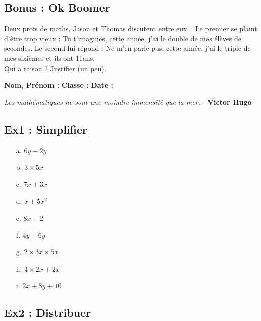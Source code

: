 \documentclass[11pt]{article}
\newcommand{\Pointilles}[1][3]{%
  \multido{}{#1}{\makebox[\linewidth]{\dotfill}\\[\parskip]
}}
\begin{document}
\Pointilles[18] 

\subsection*{Bonus : Ok Boomer}
Deux profs de maths, Jason et Thomas discutent entre eux... Le premier se plaint d'être trop vieux : \og Tu t'imagines, cette année, j'ai le double de mes élèves de secondes. \fg Le second lui répond : \og Ne m'en parle pas, cette année, j'ai le triple de mes sixièmes et ils ont 11ans. \fg \\
Qui a raison ? Justifier (un peu).

\Pointilles[3] \newpage

\textbf{Nom, Prénom :} \hspace{8cm} \textbf{Classe :} \hspace{3cm} \textbf{Date :}\\
\vspace{-0.8cm}
\begin{center}
  \textit{Les mathématiques ne sont une moindre immensité que la mer.}  - \textbf{Victor Hugo}
\end{center}
\vspace{-0.8cm}

\subsection*{Ex1 : Simplifier}

\begin{multicols}{3}

\begin{enumerate}
  \item[a.] $6y - 2y$
  \item[b.] $3 \times 5 x$
  \item[c.] $7x + 3x$
  \item[d.] $x + 5x^2$
  \item[e.] $8x - 2$
  \item[f.] $4y - 6y$
  \item[g.] $2 \times 3x \times 5x$
  \item[h.] $4 \times 2x + 2x$
  \item[i.] $2x + 8y + 10$    
\end{enumerate}

\end{multicols}

 \Pointilles[8] 

 \subsection*{Ex2 : Distribuer}
\end{document}
